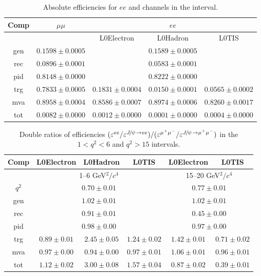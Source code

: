 \begin{table}
\centering
\begin{tabular}{|c|c|c|c|c|}
\hline Comp 			&  $\mu\mu$ 	& \multicolumn {3}{c|}{$ee$} \\ \hline
	&   &  L0Electron 	& L0Hadron 	& L0TIS \\ \hline
gen  & $ 0.1598  \pm  0.0005 $ & \multicolumn{3}{c|}{$ 0.1589  \pm  0.0005 $} \\
rec  & $ 0.0896  \pm  0.0001 $ & \multicolumn{3}{c|}{$ 0.0583  \pm  0.0001 $} \\
pid  & $ 0.8148  \pm  0.0000 $ & \multicolumn{3}{c|}{$ 0.8222  \pm  0.0000 $} \\
\hline
trg  & $ 0.7833  \pm  0.0005 $ & $ 0.1831  \pm  0.0004 $ & $ 0.0150  \pm  0.0001 $ & $ 0.0565  \pm  0.0002 $ \\
mva  & $ 0.8958  \pm  0.0004 $ & $ 0.8586  \pm  0.0007 $ & $ 0.8974  \pm  0.0006 $ & $ 0.8260  \pm  0.0017 $ \\
tot  & $ 0.0082  \pm  0.0000 $ & $ 0.0012  \pm  0.0000 $ & $ 0.0001  \pm  0.0000 $ & $ 0.0004  \pm  0.0000 $ \\
\hline
\end{tabular}
\caption{Absolute efficiencies for $ee$ and \mumu channels in the \jpsi \qsq interval.}
\label{tab:AbsEff_jpsi}
\end{table}

\begin{table}
\centering
\begin{tabular}{|c|c|c|c|c|c|}
\hline Comp &  L0Electron 	& L0Hadron 	& L0TIS &  L0Electron 	& L0TIS\\ \hline
 	&  \multicolumn{3}{c|}{ 1--6 GeV$^2/c^4$} &  \multicolumn{2}{c|}{ 15--20 GeV$^2/c^4$ } \\ \hline
$q^2$  & \multicolumn{3}{c|}{$ 0.70  \pm  0.01 $} &  \multicolumn{2}{c|}{$ 0.77  \pm  0.01 $} \\
gen  & \multicolumn{3}{c|}{$ 1.02  \pm  0.01 $} &  \multicolumn{2}{c|}{$ 1.02  \pm  0.01 $} \\
rec  & \multicolumn{3}{c|}{$ 0.91  \pm  0.01 $} &  \multicolumn{2}{c|}{$ 0.45  \pm  0.00 $} \\
pid  & \multicolumn{3}{c|}{$ 0.98  \pm  0.00 $} &  \multicolumn{2}{c|}{$ 0.97  \pm  0.00 $} \\
\hline
trg  & $ 0.89  \pm  0.01 $ & $ 2.45  \pm  0.05 $ & $ 1.24  \pm  0.02 $ & $ 1.42  \pm  0.01 $ & $ 0.71  \pm  0.02$ \\ 
mva  & $ 0.97  \pm  0.00 $ & $ 0.94  \pm  0.00 $ & $ 0.97  \pm  0.01 $ & $ 1.06  \pm  0.01 $ & $ 0.96  \pm  0.01$ \\ 
tot  & $ 1.12  \pm  0.02 $ & $ 3.00  \pm  0.08 $ & $ 1.57  \pm  0.04 $ & $ 0.87  \pm  0.02 $ & $ 0.39  \pm  0.01$ \\ 
\hline
\end{tabular}
\caption{Double ratios of efficiencies 
$(\varepsilon^{ee} / \varepsilon^{\jpsi\to ee}) / (\varepsilon^{\mumu} / \varepsilon^{\jpsi\to\mumu})$
in the $1 < q^2 < 6$ and $q^2 > 15$ \gevgevcccc intervals.}
\label{tab:double_rel_eff}
\end{table}


